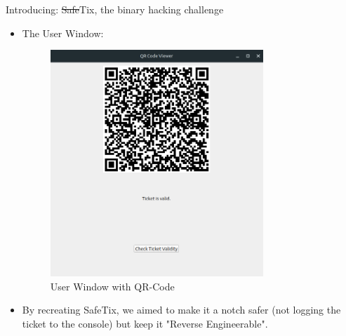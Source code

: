 \documentclass[final,dvipsnames]{beamer}
\newlength{\sepwidth}
\newlength{\colwidth}
\newcommand{\separatorcolumn}{\begin{column}{\sepwidth}\end{column}}
\begin{document}
\begin{frame}[t, fragile]
\begin{columns}[t]
\begin{column}{\colwidth}
\begin{block}{Introducing: \sout{Safe}Tix, the binary hacking challenge}
\begin{itemize}
\begin{figure}[h]
				\caption{WorkFlow of the Program}
				\label{fig:WorkFlow1}
			\end{figure}
            \item The User Window:
            \begin{figure}[h]
				\centering
				\includegraphics[width=0.8\textwidth]{figures/QR_Window.png}
				\caption{User Window with QR-Code}
				\label{fig:WorkFlow1}
			\end{figure}
            \item By recreating SafeTix, we aimed to make it a notch safer (not logging the ticket to the console) but keep it "Reverse Engineerable".
		\end{itemize}

	\end{block}

\end{column}

\separatorcolumn


\end{columns}
\end{frame}
\end{document}
